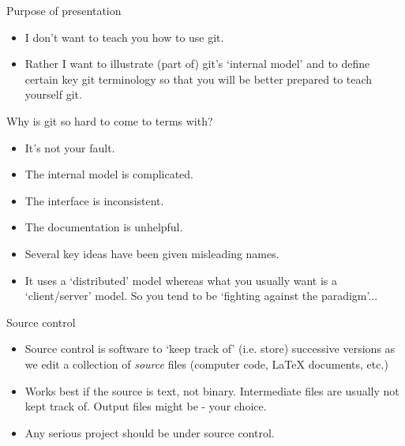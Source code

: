 \documentclass[usenames,dvipsnames]{beamer}
\begin{document}
\begin{frame}{Purpose of presentation}
  \begin{block}{}
    \begin{itemize}
      \item{I don't want to teach you how to use git.}
      \item{Rather I want to illustrate (part of) git's `internal model' and to define certain key git terminology so that you will be better prepared to teach yourself git.}
    \end{itemize}
  \end{block}
\end{frame}

\begin{frame}{Why is git so hard to come to terms with?}
  \begin{block}{}
    \begin{itemize}
      \item{It's not your fault.}
    \end{itemize}
  \end{block}
  \begin{block}{}
    \begin{itemize}
      \item{The internal model is complicated.}
      \item{The interface is inconsistent.}
      \item{The documentation is unhelpful.}
      \item{Several key ideas have been given misleading names.}
      \item{It uses a `distributed' model whereas what you usually want is a `client/server' model. So you tend to be `fighting against the paradigm'...}
    \end{itemize}
  \end{block}
\end{frame}

\begin{frame}{Source control}
  \begin{block}{}
    \begin{itemize}
      \item{Source control is software to `keep track of' (i.e. store) successive versions as we edit a collection of \textit{source} files (computer code, \LaTeX{} documents, etc.)}
      \item{Works best if the source is text, not binary. Intermediate files are usually not kept track of. Output files might be - your choice.}
      \item{Any serious project should be under source control.}
    \end{itemize}
  \end{block}
\end{frame}
\end{document}
